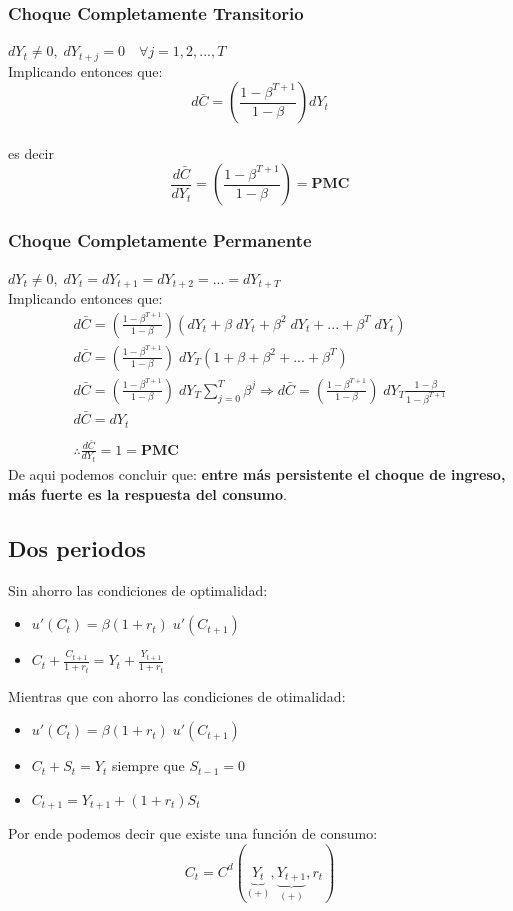 \documentclass[12pt]{article}
\begin{document}
\subsubsection{Choque Completamente Transitorio}
$dY_t \neq 0, \; dY_{t+j}=0 \quad \forall j=1,2,...,T$\\
Implicando entonces que: $$d\bar{C}=(\frac{1-\beta^{T+1}}{1-\beta}) dY_t$$\\ 
es decir $$\frac{d\bar{C}}{dY_t}=(\frac{1-\beta^{T+1}}{1-\beta})=\textbf{PMC}$$
\subsubsection{Choque Completamente Permanente}
$dY_t \neq 0, \; dY_t=dY_{t+1}= dY_{t+2}=...= dY_{t+T}$\\
Implicando entonces que: 
\begin{align*}
    d\bar{C}=(\frac{1-\beta^{T+1}}{1-\beta}) (dY_t+\beta \;dY_t+\beta ^2 \; dY_t+...+\beta ^T\; dY_t)\\
    d\bar{C}=(\frac{1-\beta^{T+1}}{1-\beta})\;dY_T (1+\beta+\beta^2+...+\beta^T)\\
    d\bar{C}=(\frac{1-\beta^{T+1}}{1-\beta})\;dY_T \sum_{j=0}^T\beta^j\Rightarrow{}d\bar{C}=(\frac{1-\beta^{T+1}}{1-\beta})\;dY_T\frac{1-\beta}{1-\beta^{T+1}}\\ 
    d\bar{C}=dY_t\\\\
    \therefore \frac{ d\bar{C}}{dY_t}=1 =\textbf{PMC}
\end{align*}
De aqui podemos concluir que: \textbf{entre más persistente el choque de ingreso, más fuerte es la respuesta del consumo}.
\newpage
\subsection{Dos periodos}
Sin ahorro las condiciones de optimalidad: 
\begin{itemize}
    \item $u'(C_t)=\beta (1+r_t)\; u'(C_{t+1})$
    \item $C_{t}+\frac{C_{t+1}}{1+r_t}=Y_t+\frac{Y_{t+1}}{1+r_t}$
\end{itemize}
Mientras que con ahorro las condiciones de otimalidad: 
\begin{itemize}
    \item $u'(C_t)=\beta (1+r_t)\; u'(C_{t+1})$
    \item $C_t+S_t=Y_t$ siempre que $S_{t-1}=0$
    \item $C_{t+1}=Y_{t+1}+(1+r_t)S_t$
\end{itemize}
Por ende podemos decir que existe una función de consumo: 
$$C_t=C^d(\underbrace{Y_t}_{(+)},\underbrace{Y_{t+1}}_{(+)},{r_t} )$$
\end{document}
